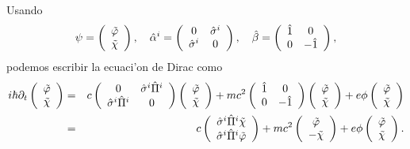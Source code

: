 Usando 
\begin{equation}
\psi=\left(
\begin{array}
[c]{c}%
\tilde{\varphi}\\
\tilde{\chi}%
\end{array}
\right) ,\quad 
\hat{\alpha}^i=\left(
\begin{array}
[c]{cc}%
0 & \hat{\sigma}^i\\
\hat{\sigma}^i & 0
\end{array}
\right) ,\quad
\hat{\beta}=\left(
\begin{array}
[c]{cc}%
\hat{1} & 0\\
0 & -\hat{1}%
\end{array}
\right),
\end{equation}
podemos escribir la ecuaci'on de Dirac como
\begin{eqnarray}
i\hbar\partial_{t}\left(
\begin{array}
[c]{c}%
\tilde{\varphi}\\
\tilde{\chi}%
\end{array}
\right) &=&c\left(
\begin{array}
[c]{cc}%
0 & \hat{\sigma}^i\hat{\Pi}^i\\
\hat{\sigma}^i\hat{\Pi}^i & 0
\end{array}
\right) \left(
\begin{array}
[c]{c}%
\tilde{\varphi}\\
\tilde{\chi}%
\end{array}
\right) +mc^2\left(
\begin{array}
[c]{cc}%
\hat{1} & 0\\
0 & -\hat{1}%
\end{array}
\right) \left(
\begin{array}
[c]{c}%
\tilde{\varphi}\\
\tilde{\chi}%
\end{array}
\right) +e\phi\left(
\begin{array}
[c]{c}%
\tilde{\varphi}\\
\tilde{\chi}%
\end{array}
\right)\\
 &=&c\left(
\begin{array}
[c]{c}%
\hat{\sigma}^i\hat{\Pi}^i\tilde{\chi}\\
\hat{\sigma}^i\hat{\Pi}^i\tilde{\varphi}%
\end{array}
\right) +mc^2\left(
\begin{array}
[c]{c}%
\tilde{\varphi}\\
-\tilde{\chi}%
\end{array}
\right) +e\phi\left(
\begin{array}
[c]{c}%
\tilde{\varphi}\\
\tilde{\chi}%
\end{array}
\right).
\end{eqnarray}
